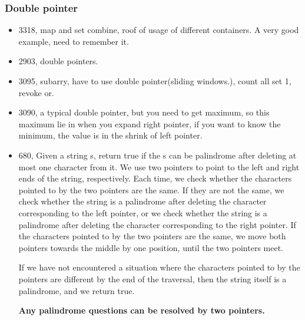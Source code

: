 \documentclass[a4paper,11pt,twoside]{book}
\begin{document}
	
\subsubsection{Double pointer}

\begin{itemize}
	
		\item 3318, map and set combine, roof of usage of different containers.  A very good example, need to remember it. 
	
		\item 2903, double pointers. 
		
		\item 3095,  subarry, have to use double pointer(sliding windows.), count all set 1, revoke or. 
	
	\item 3090, a typical double pointer, but you need to get maximum, so this maximum lie in when you expand right pointer, if you want to know the minimum, the value is in the shrink of left pointer. 
	
		\item 680, Given a string s, return true if the s can be palindrome after deleting at most one character from it. We use two pointers to point to the left and right ends of the string, respectively. Each time, we check whether the characters pointed to by the two pointers are the same. If they are not the same, we check whether the string is a palindrome after deleting the character corresponding to the left pointer, or we check whether the string is a palindrome after deleting the character corresponding to the right pointer. If the characters pointed to by the two pointers are the same, we move both pointers towards the middle by one position, until the two pointers meet.
	
	If we have not encountered a situation where the characters pointed to by the pointers are different by the end of the traversal, then the string itself is a palindrome, and we return true.
	
	\textbf{Any palindrome questions can be resolved by two pointers.}
\end{itemize}
	
\end{document}
